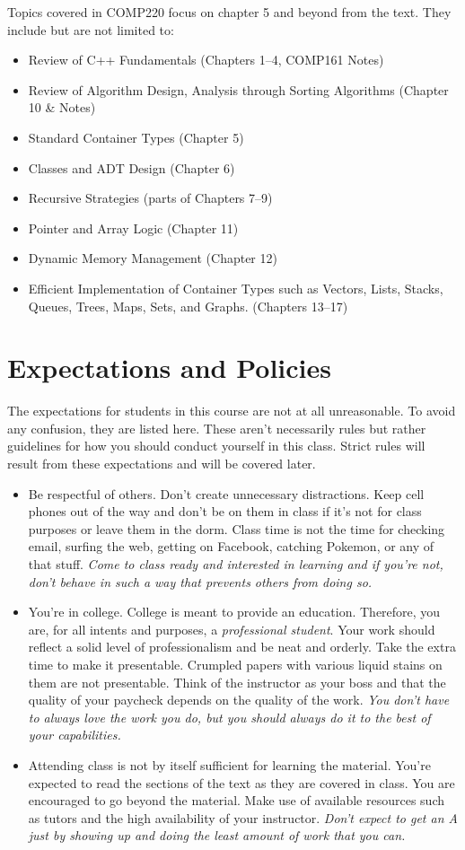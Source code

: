 \documentclass[nobib]{tufte-handout}
\begin{document}
Topics covered in COMP220 focus on chapter 5 and beyond from the text. They include but are not limited to:
\begin{itemize}
\item Review of C++ Fundamentals (Chapters 1--4, COMP161 Notes)
\item Review of Algorithm Design, Analysis through Sorting Algorithms (Chapter 10 \& Notes)
\item Standard Container Types (Chapter 5)
\item Classes and ADT Design (Chapter 6)
\item Recursive Strategies (parts of Chapters 7--9)
\item Pointer and Array Logic (Chapter 11)
\item Dynamic Memory Management (Chapter 12)
\item Efficient Implementation of Container Types such as Vectors, Lists, Stacks, Queues, Trees, Maps, Sets, and Graphs. (Chapters 13--17)
\end{itemize}


\section{Expectations and Policies}
The expectations for students in this course are not at all unreasonable.  To avoid any confusion, they are listed here.  These aren't necessarily rules but rather guidelines for how you should conduct yourself in this class.  Strict rules will result from these expectations and will be covered later.
\begin{itemize}
\item Be respectful of others.  Don't create unnecessary distractions.  Keep cell phones out of the way and don't be on them in class if it's not for class purposes or leave them in the dorm.  Class time is not the time for checking email, surfing the web, getting on Facebook, catching Pokemon, or any of that stuff. \textit{Come to class ready and interested in learning and if you're not, don't behave in such a way that prevents others from doing so.}
\item You're in college.  College is meant to provide an education.  Therefore, you are, for all intents and purposes, a \textit{professional student}.  Your work should reflect a solid level of professionalism and be neat and orderly.  Take the extra time to make it presentable.  Crumpled papers with various liquid stains on them are not presentable.  Think of the instructor as your boss and that the quality of your paycheck depends on the quality of the work.  \textit{You don't have to always love the work you do, but you should always do it to the best of your capabilities.}
\item Attending class is not by itself sufficient for learning the material.  You're expected to read the sections of the text as they are covered in class.  You are encouraged to go beyond the material.  Make use of available resources such as tutors and the high availability of your instructor.  \textit{Don't expect to get an A just by showing up and doing the least amount of work that you can.}
\end{itemize}
\end{document}

